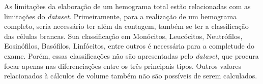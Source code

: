 As limitações da elaboração de um hemograma total estão relacionadas com as limitações do \emph{dataset}. Primeiramente, para a realização de um hemograma completo, seria necessário ter além da contagem, também se ter a classificação das células brancas. Sua classificação em Monócitos, Leucócitos, Neutrófilos, Eosinófilos, Basófilos, Linfócitos, entre outros é necessária para a completude do exame. Porém, essas classificações não são apresentadas pelo \emph{dataset}, que procura focar apenas nas diferenciações entre os três principais tipos. Outros valores relacionados à cálculos de volume também não são possíveis de serem calculados.
